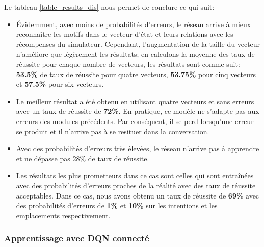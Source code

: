 Le tableau \ref{table_results_dis} nous permet de conclure ce qui suit:
\begin{itemize}
	\item Évidemment, avec moins de probabilités d'erreurs, le réseau arrive à mieux reconnaître les motifs dans le vecteur d'état et leurs relations avec les récompenses du simulateur. Cependant, l'augmentation de la taille du vecteur n'améliore que légèrement les résultats; en calculons la moyenne des taux de réussite pour chaque nombre de vecteurs, les résultats sont comme suit: \textbf{53.5\%} de taux de réussite pour quatre vecteurs, \textbf{53.75\%} pour cinq vecteurs et \textbf{57.5\%} pour six vecteurs.
	\item Le meilleur résultat a été obtenu en utilisant quatre vecteurs et sans erreurs avec un taux de réussite de \textbf{72\%}. En pratique, ce modèle ne s'adapte pas aux erreurs des modules précédents. Par conséquent, il se perd lorsqu'une erreur se produit et il n'arrive pas à se resituer dans la conversation.
	\item Avec des probabilités d'erreurs très élevées, le réseau n'arrive pas à apprendre et ne dépasse pas 28\% de taux de réussite.
	\item Les résultats les plus prometteurs dans ce cas sont celles qui sont entraînées avec des probabilités d'erreurs proches de la réalité avec des taux de réussite acceptables. Dans ce cas, nous avons obtenu un taux de réussite de \textbf{69\%} avec des probabilités d'erreurs de \textbf{1\%} et \textbf{10\%} sur les intentions et les emplacements respectivement.
\end{itemize}

\subsubsection{Apprentissage avec DQN connecté}
